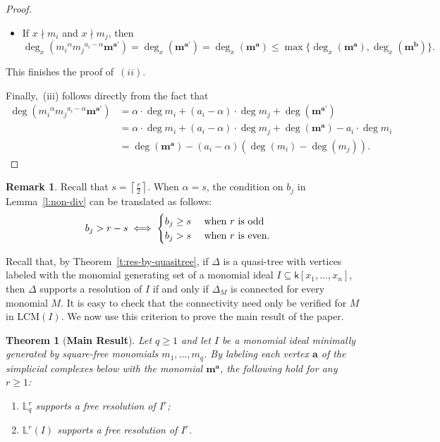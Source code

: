 \documentclass[11pt]{article}
\newtheorem{theorem}[theo]{Theorem}
\theoremstyle{definition}
\newtheorem{rema}[theo]{Remark}
\numberwithin{equation}{section}
\newcommand{\m}{\mathbf{m}}
\newcommand{\LCM}{\mathrm{LCM}}
\newcommand{\D}{\Delta}
\newcommand{\Lrq}{\mathbb{L}^r_q}
\newcommand{\Lr}{\mathbb{L}^r}
\newcommand{\ba}{\mathbf{a}}
\newcommand{\bb}{\mathbf{b}}
\newcommand{\bma}{\mathbf{m}^\ba}
\newcommand{\bmb}{\mathbf{m}^\bb}
\newcommand{\sfk}{\mathsf k}
\begin{document}
\begin{proof}
\begin{itemize}
    
   \item If $x\nmid m_i$ and $x\nmid m_j$, then
     $$\deg_x({m_i}^\alpha{m_j}^{a_i-\alpha}\m^{\ba'}) = \deg_x(\m^{\ba'}) = \deg_x(\bma) \leq \max \{
     \deg_x(\bma), \deg_x(\bmb) \}.$$
\end{itemize}

   This finishes the proof of~$(ii)$.

   Finally,~\textup{(}iii\textup{)} follows directly from the fact that
\begin{align*}
\deg({m_i}^{\alpha}{m_j}^{a_i-\alpha}\m^{\ba'}) &= \alpha \cdot \deg m_i+(a_i-\alpha) \cdot \deg m_j + \deg (\m^{\ba'}) \\
&= \alpha \cdot \deg m_i+(a_i-\alpha) \cdot \deg m_j + \deg (\bma) - a_i \cdot \deg m_i \\
&= \deg(\bma)-(a_i-\alpha)(\deg(m_i)-\deg(m_j)). 
\end{align*}
\end{proof}


\begin{rema}
\label{r:connection}
Recall that $s=\left\lceil{\frac{r}{2}}\right\rceil$. When $\alpha=s$, the condition on $b_j$ in Lemma~\ref{l:non-div} can be translated as follows: 
$$
b_j>r-s\iff \begin{cases} \text{$b_j\ge s$ \quad when $r$ is odd}\\
\text{$b_j>s$ \quad when $r$ is even.}
\end{cases} 
$$
\end{rema}

Recall that, by Theorem~\ref{t:res-by-quasitree}, if $\D$ is a quasi-tree
with vertices labeled with the monomial generating set of a monomial
ideal $I \subseteq \sfk[x_1, \ldots, x_n]$, then $\D$ supports a
resolution of $I$ if and only if $\D_M$ is connected for every
monomial $M$. It is easy to check that the connectivity need only be
verified for $M$ in $\LCM(I)$.  We now use this criterion to prove the
main result of the paper.

\begin{theorem}[{\bf Main Result}]\label{t:main}
  Let $q\ge 1$ and let $I$ be a monomial ideal minimally generated by
  square-free monomials $m_1, \dots, m_q$.  By labeling each vertex
  $\ba$ of the simplicial complexes below with the monomial $\bma$, the
  following hold for any $r\ge 1$:
\begin{enumerate}[label=\textup{(}\roman*\textup{)}] 
\item $\Lrq$ supports a free resolution of $I^r$;
\item $\Lr(I)$ supports a free resolution of $I^r$.
\end{enumerate}
\end{theorem}
\end{document}
